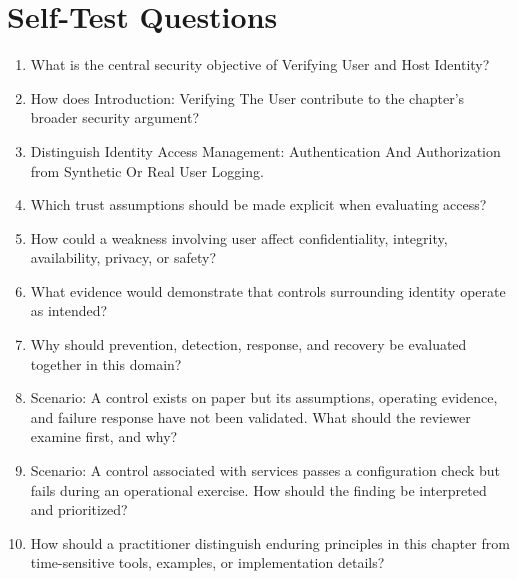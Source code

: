 \documentclass[11pt]{article}
\begin{document}
\section*{Self-Test Questions}
\begin{enumerate}
\item What is the central security objective of Verifying User and Host Identity?
\item How does Introduction: Verifying The User contribute to the chapter's broader security argument?
\item Distinguish Identity Access Management: Authentication And Authorization from Synthetic Or Real User Logging.
\item Which trust assumptions should be made explicit when evaluating access?
\item How could a weakness involving user affect confidentiality, integrity, availability, privacy, or safety?
\item What evidence would demonstrate that controls surrounding identity operate as intended?
\item Why should prevention, detection, response, and recovery be evaluated together in this domain?
\item Scenario: A control exists on paper but its assumptions, operating evidence, and failure response have not been validated. What should the reviewer examine first, and why?
\item Scenario: A control associated with services passes a configuration check but fails during an operational exercise. How should the finding be interpreted and prioritized?
\item How should a practitioner distinguish enduring principles in this chapter from time-sensitive tools, examples, or implementation details?
\end{enumerate}
\end{document}
